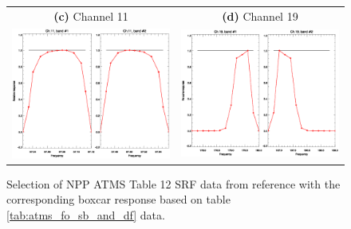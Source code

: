 \begin{figure}[htp]
\begin{tabular}{c c}
    \textsf{\textbf{(c)} Channel 11} &
    \textsf{\textbf{(d)} Channel 19} \\
    \includegraphics[scale=0.5]{graphics/srf/atms_npp.ch11.srf.eps} &
    \includegraphics[scale=0.5]{graphics/srf/atms_npp.ch19.srf.eps}
  \end{tabular}
  \caption{Selection of NPP ATMS Table 12 SRF data from reference \cite{ATMS_PFM_CalLog} with the corresponding boxcar response based on table \ref{tab:atms_fo_sb_and_df} data.}
  \label{fig:srf_selection}
\end{figure}


